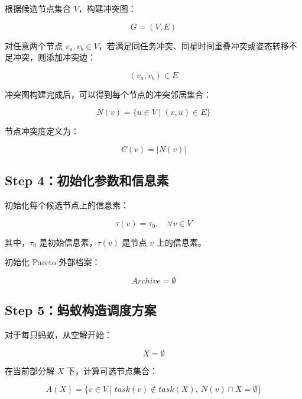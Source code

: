 \documentclass[UTF8,a4paper,12pt]{ctexart}
\begin{document}
根据候选节点集合 $V$，构建冲突图：

\begin{equation}
G=(V,E)
\end{equation}

对任意两个节点 $v_a,v_b\in V$，若满足同任务冲突、同星时间重叠冲突或姿态转移不足冲突，则添加冲突边：

\begin{equation}
(v_a,v_b)\in E
\end{equation}

冲突图构建完成后，可以得到每个节点的冲突邻居集合：

\begin{equation}
N(v)=\{u\in V\mid (v,u)\in E\}
\end{equation}

节点冲突度定义为：

\begin{equation}
C(v)=|N(v)|
\end{equation}

\subsection{Step 4：初始化参数和信息素}

初始化每个候选节点上的信息素：

\begin{equation}
\tau(v)=\tau_0,\quad \forall v\in V
\end{equation}

其中，$\tau_0$ 是初始信息素，$\tau(v)$ 是节点 $v$ 上的信息素。

初始化 Pareto 外部档案：

\begin{equation}
Archive=\emptyset
\end{equation}

\subsection{Step 5：蚂蚁构造调度方案}

对于每只蚂蚁，从空解开始：

\begin{equation}
X=\emptyset
\end{equation}

在当前部分解 $X$ 下，计算可选节点集合：

\begin{equation}
A(X)=\{v\in V\mid task(v)\notin task(X),\ N(v)\cap X=\emptyset\}
\end{equation}
\end{document}

